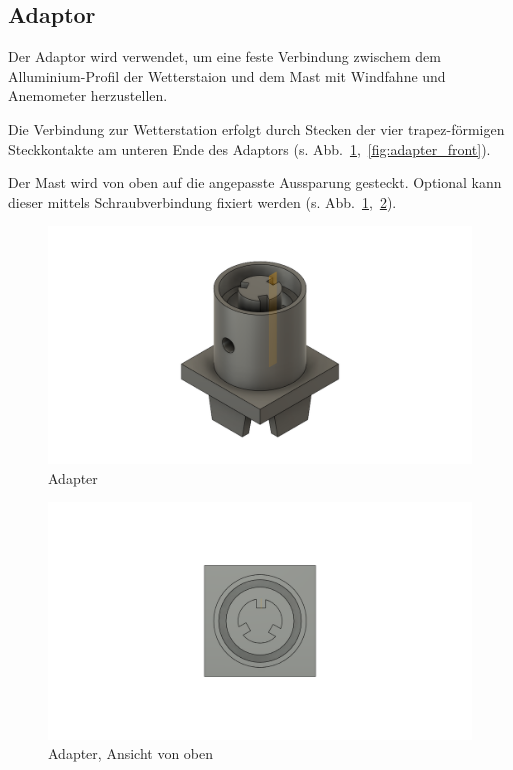 \subsection{Adaptor}\label{sec:ge_adapt}
Der Adaptor wird verwendet, um eine feste Verbindung zwischem dem Alluminium-Profil der Wetterstaion und dem Mast mit Windfahne und Anemometer herzustellen.

Die Verbindung zur Wetterstation erfolgt durch Stecken der vier trapez-förmigen Steckkontakte am unteren Ende des Adaptors (s. Abb.~\ref{fig:adapter},~\ref{fig:adapter_front}).

Der Mast wird von oben auf die angepasste Aussparung gesteckt. Optional kann dieser mittels Schraubverbindung fixiert werden (s. Abb.~\ref{fig:adapter},~\ref{fig:adapter_top}).
\begin{figure}[H]
  \centering
  \includegraphics[width=\textwidth]{./img/ST_Adapterv4}
  \caption{Adapter}\label{fig:adapter}
\end{figure}
\begin{figure}[H]
  \centering
  \includegraphics[width=\textwidth]{./img/ST_Adapterv4_top}
  \caption{Adapter, Ansicht von oben}\label{fig:adapter_top}
\end{figure}

